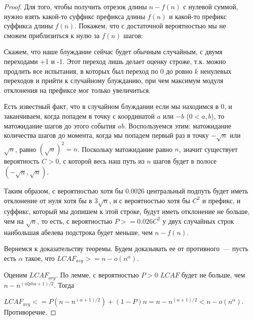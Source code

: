 \begin{proof}
Для того, чтобы получить отрезок длины $n-f(n)$ с нулевой суммой, нужно взять какой-то суффикс префикса длины $f(n)$ и какой-то префикс суффикса длины $f(n)$. Покажем, что с достаточной вероятностью мы не сможем приблизиться к нулю за $f(n)$ шагов:

Скажем, что наше блуждание сейчас будет обычным случайным, с двумя переходами +1 и -1. Этот переход лишь делает оценку строже, т.к. можно продлить все испытания, в которых был переход по 0 до ровно $k$ ненулевых переходов и прийти к случайному блужданию, при чем максимум модуля отклонения на префиксе мог только увеличиться.

Есть известный факт, что в случайном блуждании если мы находимся в 0, и заканчиваем, когда попадем в точку с координатой $a$ или $-b$ ($0 < a, b$), то матожидание шагов до этого события $ab$. Воспользуемся этим: матожидание количества шагов до момента, когда мы попадем первый раз в точку $-\sqrt n$ или $\sqrt n$, равно $(\sqrt n)^2=n$. Поскольку матожидание равно $n$, значит существует вероятность $C>0$, с которой весь наш путь из $n$ шагов будет в полосе $(-\sqrt n, \sqrt n)$.

Таким образом, с вероятностью хотя бы 0.0026 центральный подпуть будет иметь отклонение от нуля хотя бы в $3\sqrt n$, и с вероятностью хотя бы $C^2$ и префикс, и суффикс, который мы допишем к этой строке, будут иметь отклонение не больше, чем на $\sqrt n$, то есть, с вероятностью $P>=0.026C^2$ у двух случайных строк наибольшая абелева подстрока будет меньше, чем $n-f(n)$.

Вернемся к доказательству теоремы. Будем доказывать ее от противного~--- пусть есть $\alpha$ такое, что $LCAF_{avg} >= n - o(n^\alpha)$. 

Оценим $LCAF_{avg}$. По лемме, с вероятностью $P>0$ $LCAF$ будет не больше, чем $n-n^{(alpha+1)/2}$. Тогда

$LCAF_{avg} <= P (n-n^{(\alpha+1)/2}) + (1-P)n = n-n^{(\alpha+1)/2} < n - o(n^\alpha)$. Противоречие.

\end{proof}


